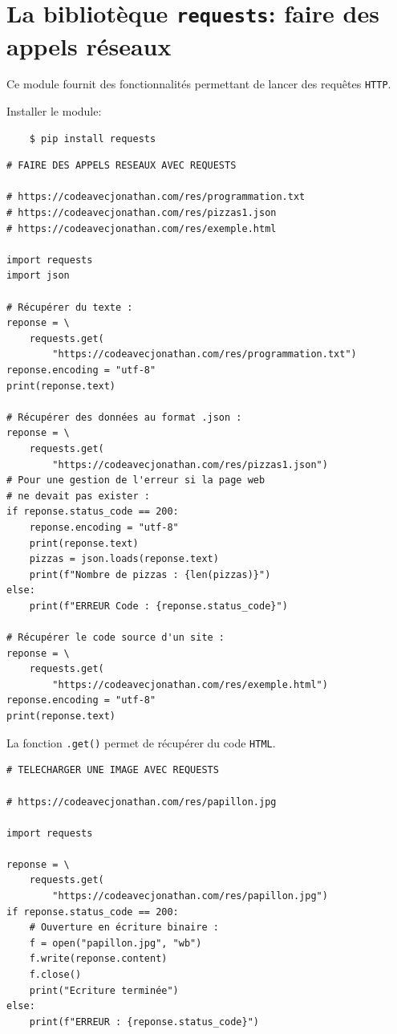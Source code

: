\documentclass[a4paper,11pt]{book}
\begin{document}
\section{La bibliotèque \texttt{requests}: faire des appels réseaux}
Ce module fournit des fonctionnalités permettant de lancer des requêtes \texttt{HTTP}.
\medskip

Installer le module:
\begin{verbatim}
    $ pip install requests
\end{verbatim}
\medskip

\begin{lstlisting}[caption=Un premier exemple avec le module \texttt{requests}]
# FAIRE DES APPELS RESEAUX AVEC REQUESTS

# https://codeavecjonathan.com/res/programmation.txt
# https://codeavecjonathan.com/res/pizzas1.json
# https://codeavecjonathan.com/res/exemple.html

import requests
import json

# Récupérer du texte :
reponse = \ 
    requests.get(
        "https://codeavecjonathan.com/res/programmation.txt")
reponse.encoding = "utf-8"
print(reponse.text)

# Récupérer des données au format .json :
reponse = \
    requests.get(
        "https://codeavecjonathan.com/res/pizzas1.json")
# Pour une gestion de l'erreur si la page web 
# ne devait pas exister :
if reponse.status_code == 200:
    reponse.encoding = "utf-8"
    print(reponse.text)
    pizzas = json.loads(reponse.text)
    print(f"Nombre de pizzas : {len(pizzas)}")
else:
    print(f"ERREUR Code : {reponse.status_code}")

# Récupérer le code source d'un site :
reponse = \
    requests.get(
        "https://codeavecjonathan.com/res/exemple.html")
reponse.encoding = "utf-8"
print(reponse.text)
\end{lstlisting}
\medskip

La fonction \texttt{.get()} permet de récupérer du code \texttt{HTML}.
\medskip

\begin{lstlisting}[caption=Télécharger une image avec le module \texttt{requests}]
# TELECHARGER UNE IMAGE AVEC REQUESTS

# https://codeavecjonathan.com/res/papillon.jpg

import requests

reponse = \
    requests.get(
        "https://codeavecjonathan.com/res/papillon.jpg")
if reponse.status_code == 200:
    # Ouverture en écriture binaire :
    f = open("papillon.jpg", "wb")  
    f.write(reponse.content)
    f.close()
    print("Ecriture terminée")
else:
    print(f"ERREUR : {reponse.status_code}")
\end{lstlisting}
\medskip
\end{document}
